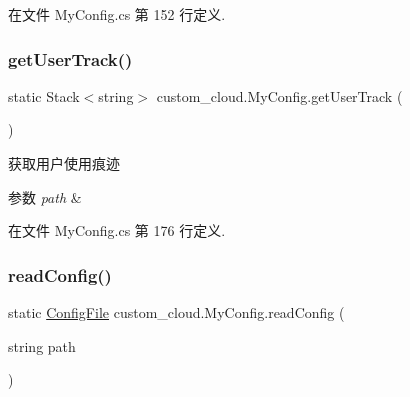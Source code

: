 在文件 My\+Config.\+cs 第 152 行定义.

\mbox{\label{classcustom__cloud_1_1_my_config_a7e17aba0aeb5fddb695d54c282bfc2d0}} 
\subsubsection{\texorpdfstring{get\+User\+Track()}{getUserTrack()}\hspace{0.1cm}{\footnotesize\ttfamily [2/2]}}
{\footnotesize\ttfamily static Stack$<$string$>$ custom\+\_\+cloud.\+My\+Config.\+get\+User\+Track (\begin{DoxyParamCaption}{ }\end{DoxyParamCaption})\hspace{0.3cm}{\ttfamily [static]}}



获取用户使用痕迹 


\begin{DoxyParams}{参数}
{\em path} & \\
\hline
\end{DoxyParams}


在文件 My\+Config.\+cs 第 176 行定义.

\mbox{\label{classcustom__cloud_1_1_my_config_a2353b96c780635238ee19ba5d24f218e}} 
\subsubsection{\texorpdfstring{read\+Config()}{readConfig()}\hspace{0.1cm}{\footnotesize\ttfamily [1/2]}}
{\footnotesize\ttfamily static \hyperlink{classcustom__cloud_1_1_my_config_1_1_config_file}{Config\+File} custom\+\_\+cloud.\+My\+Config.\+read\+Config (\begin{DoxyParamCaption}\item[{string}]{path }\end{DoxyParamCaption})\hspace{0.3cm}{\ttfamily [static]}}



